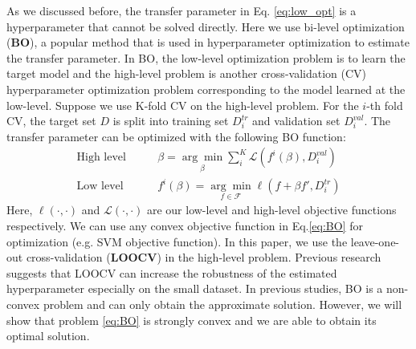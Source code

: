 As we discussed before, the transfer parameter in Eq. \eqref{eq:low_opt} is a hyperparameter that cannot be solved directly. 
Here we use bi-level optimization (\textbf{BO})\cite{Pedregosa16}, a popular method that is used in hyperparameter optimization to estimate the transfer parameter. In BO, the low-level optimization problem is to learn the target model and the high-level problem is another cross-validation (CV) hyperparameter optimization problem corresponding to the model learned at the low-level.
Suppose we use K-fold CV on the high-level problem. For the $i$-th fold CV, the target set $D$ is split into training set $D_i^{tr}$ and validation set $D_i^{val}$. The transfer parameter can be optimized with the following BO function:
\begin{equation}\label{eq:BO}
\begin{aligned}
\text{High level}\qquad&\beta=\underset{\beta}{\arg \min}\sum_i^K\mathcal{L}(f^{i}(\beta),D_i^{val})\\
\text{Low level}\qquad&f^{i}(\beta)=\underset{f \in \mathcal{F}}{\arg \min}\ell\left(f+\beta f',D_i^{tr}\right) 
\end{aligned}
\end{equation} 
Here, $\ell(\cdot,\cdot)$ and $\mathcal{L}(\cdot,\cdot)$ are our low-level and high-level objective functions respectively. We can use any convex objective function in Eq.\eqref{eq:BO} for optimization (e.g. SVM objective function). In this paper, we use the leave-one-out cross-validation (\textbf{LOOCV}) in the high-level problem. Previous research \cite{kuzborskij2013stability} suggests that LOOCV can increase the robustness of the estimated hyperparameter especially on the small dataset.
In previous studies\cite{maclaurin2015gradient,Pedregosa16}, BO is a non-convex problem and can only obtain the approximate solution. However, we will show that problem \eqref{eq:BO} is strongly convex and we are able to obtain its optimal solution. 
